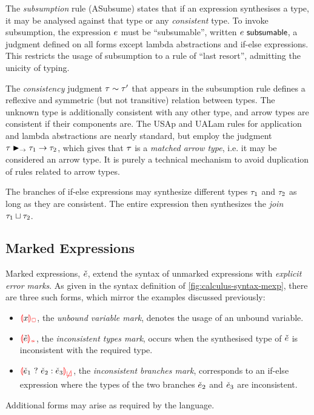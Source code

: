 The \emph{subsumption} rule (ASubsume) states that if an expression synthesises a type, it may be
analysed against that type or any \emph{consistent} type. To invoke subsumption, the expression
$e$ must be ``subsumable'', written $e ~{\normalfont{\normalfont\textsf{subsumable}}}$, a judgment defined on all forms except
lambda abstractions and if-else expressions. This restricts the usage of subsumption to a rule of
``last resort'', admitting the unicity of typing.




The \emph{consistency} judgment $\tau \sim \tau'$ that appears in the subsumption rule
defines a reflexive and symmetric (but not transitive) relation between types. The unknown type is
additionally consistent with any other type, and arrow types are consistent if their components are.
The USAp and UALam rules for application and lambda abstractions are nearly standard, but employ the
judgment $\tau \blacktriangleright_{\to} \tau_1 \to \tau_2$, which gives that $\tau$ is a \emph{matched arrow
type}, i.e. it may be considered an arrow type. It is purely a technical mechanism to avoid
duplication of rules related to arrow types.



The branches of if-else expressions may synthesize different types $\tau_1$ and $\tau_2$ as long as
they are consistent. The entire expression then synthesizes the \emph{join}
$\tau_1 \sqcup \tau_2$.

\subsection{Marked Expressions}
\label{sec:calculus-mexp}

Marked expressions, $\check{e}$, extend the syntax of unmarked expressions with \emph{explicit error
marks}. As given in the syntax definition of \cref{fig:calculus-syntax-mexp}, there are three such
forms, which mirror the examples discussed previously:
%
\begin{itemize} %
  \item $\ECUnbound{x}$, the \emph{unbound variable mark}, denotes the usage of an unbound variable.

  \item $\ECInconType{\ECMV}$, the \emph{inconsistent types mark}, occurs when the synthesised type
    of $\check{e}$ is inconsistent with the required type.

  \item $\ECInconBr{\ECMV_1}{\ECMV_2}{\ECMV_3}$, the \emph{inconsistent branches mark}, corresponds
    to an if-else expression where the types of the two branches $\check{e}_2$ and $\check{e}_3$ are
    inconsistent.
\end{itemize}
%
Additional forms may arise as required by the language.

